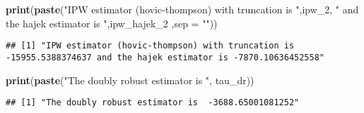 \documentclass[]{article}
\newenvironment{Shaded}{\begin{snugshade}}{\end{snugshade}}
\newcommand{\KeywordTok}[1]{\textcolor[rgb]{0.13,0.29,0.53}{\textbf{#1}}}
\newcommand{\DataTypeTok}[1]{\textcolor[rgb]{0.13,0.29,0.53}{#1}}
\newcommand{\DecValTok}[1]{\textcolor[rgb]{0.00,0.00,0.81}{#1}}
\newcommand{\StringTok}[1]{\textcolor[rgb]{0.31,0.60,0.02}{#1}}
\newcommand{\NormalTok}[1]{#1}
\begin{document}
\begin{Shaded}
\begin{Highlighting}[]
\KeywordTok{print}\NormalTok{(}\KeywordTok{paste}\NormalTok{(}\StringTok{"IPW estimator (hovic-thompson) with truncation is "}\NormalTok{,ipw_}\DecValTok{2}\NormalTok{, }\StringTok{" and the hajek estimator is "}\NormalTok{,ipw_hajek_}\DecValTok{2}\NormalTok{ ,}\DataTypeTok{sep =} \StringTok{""}\NormalTok{))}
\end{Highlighting}
\end{Shaded}

\begin{verbatim}
## [1] "IPW estimator (hovic-thompson) with truncation is -15955.5388374637 and the hajek estimator is -7870.10636452558"
\end{verbatim}

\begin{Shaded}
\begin{Highlighting}[]
\KeywordTok{print}\NormalTok{(}\KeywordTok{paste}\NormalTok{(}\StringTok{"The doubly robust estimator is "}\NormalTok{, tau_dr))}
\end{Highlighting}
\end{Shaded}

\begin{verbatim}
## [1] "The doubly robust estimator is  -3688.65001081252"
\end{verbatim}
\end{document}
